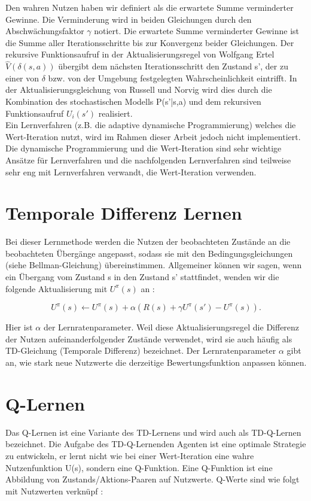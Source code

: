 Den wahren Nutzen haben wir definiert als die erwartete Summe verminderter Gewinne. Die Verminderung wird in beiden Gleichungen durch den Abschwächungsfaktor $\gamma$ notiert. Die erwartete Summe verminderter Gewinne ist die Summe aller Iterationsschritte bis zur Konvergenz beider Gleichungen. Der rekursive Funktionsaufruf in der Aktualisierungsregel von Wolfgang Ertel $\hat{V}(\delta(s,a))$ übergibt dem nächsten Iterationsschritt den Zustand s', der zu einer von $\delta$ bzw. von der Umgebung festgelegten Wahrscheinlichkeit eintrifft. In der Aktualisierungsgleichung von Russell und Norvig wird dies durch die Kombination des stochastischen Modells P(s'|s,a) und dem rekursiven Funktionsaufruf $U_i(s')$ realisiert.\\ 

Ein Lernverfahren (z.B. die adaptive dynamische Programmierung) welches die Wert-Iteration nutzt, wird im Rahmen dieser Arbeit jedoch nicht implementiert. Die dynamische Programmierung und die Wert-Iteration sind sehr wichtige Ansätze für Lernverfahren und die nachfolgenden Lernverfahren sind teilweise sehr eng mit Lernverfahren verwandt, die Wert-Iteration verwenden. \\

\section{Temporale Differenz Lernen}
\label{sec:Temporale Differenz Lernen}
Bei dieser Lernmethode werden die Nutzen der beobachteten Zustände an die beobachteten Übergänge angepasst, sodass sie mit den Bedingungsgleichungen (siehe Bellman-Gleichung) übereinstimmen. Allgemeiner können wir sagen, wenn ein Übergang vom Zustand s in den Zustand s' stattfindet, wenden wir die folgende Aktualisierung mit $U^\pi(s)$ an \cite[966\psq]{Russell}:

\begin{equation}
\label{eq:Aktualisierungsgleichung temporale Differenz}
U^\pi(s) \leftarrow U^\pi(s) + \alpha(R(s) + \gamma U^\pi(s') - U^\pi(s)).
\end{equation}

Hier ist $\alpha$ der Lernratenparameter. Weil diese Aktualisierungsregel die Differenz der Nutzen aufeinanderfolgender Zustände verwendet, wird sie auch häufig als TD-Gleichung (Temporale Differenz) bezeichnet. Der Lernratenparameter $\alpha$ gibt an, wie stark neue Nutzwerte die derzeitige Bewertungsfunktion anpassen können. 

\section{Q-Lernen}
\label{sec:Q-Lernen}
Das Q-Lernen ist eine Variante des TD-Lernens und wird auch als TD-Q-Lernen bezeichnet. Die Aufgabe des TD-Q-Lernenden Agenten ist eine optimale Strategie zu entwickeln, er lernt nicht wie bei einer Wert-Iteration eine wahre Nutzenfunktion U(s), sondern eine Q-Funktion. Eine Q-Funktion ist eine Abbildung von Zustands/Aktions-Paaren auf Nutzwerte. Q-Werte sind wie folgt mit Nutzwerten verknüpf \cite[973]{Russell}:

